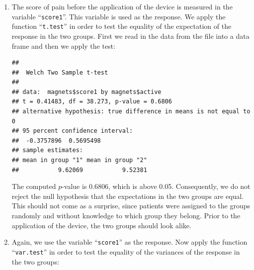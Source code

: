 \documentclass[
]{krantz}
\makeatletter
\newenvironment{Shaded}{\begin{snugshade}}{\end{snugshade}}
\newcommand{\KeywordTok}[1]{\textcolor[rgb]{0.13,0.29,0.53}{\textbf{#1}}}
\newcommand{\NormalTok}[1]{#1}
\newcommand{\OperatorTok}[1]{\textcolor[rgb]{0.81,0.36,0.00}{\textbf{#1}}}
\newcommand{\StringTok}[1]{\textcolor[rgb]{0.31,0.60,0.02}{#1}}
\newenvironment{kframe}{%
\medskip{}
\setlength{\fboxsep}{.8em}
 \def\at@end@of@kframe{}%
 \ifinner\ifhmode%
  \def\at@end@of@kframe{\end{minipage}}%
  \begin{minipage}{\columnwidth}%
 \fi\fi%
 \def\FrameCommand##1{\hskip\@totalleftmargin \hskip-\fboxsep
 \colorbox{shadecolor}{##1}\hskip-\fboxsep
     \hskip-\linewidth \hskip-\@totalleftmargin \hskip\columnwidth}%
 \MakeFramed {\advance\hsize-\width
   \@totalleftmargin\z@ \linewidth\hsize
   \@setminipage}}%
 {\par\unskip\endMakeFramed%
 \at@end@of@kframe}
\renewenvironment{Shaded}{\begin{kframe}}{\end{kframe}}
\theoremstyle{definition}
\theoremstyle{definition}
\theoremstyle{definition}
\theoremstyle{remark}
\makeatother
\begin{document}
\begin{enumerate}
\def\labelenumi{\arabic{enumi}.}
\item
  The score of pain before the
  application of the device is measured in the variable ``\texttt{score1}''. This
  variable is used as the response. We apply the function ``\texttt{t.test}'' in
  order to test the equality of the expectation of the response in the two
  groups. First we read in the data from the file into a data frame and
  then we apply the test:

\begin{Shaded}
\end{Shaded}

\begin{verbatim}
## 
##  Welch Two Sample t-test
## 
## data:  magnets$score1 by magnets$active
## t = 0.41483, df = 38.273, p-value = 0.6806
## alternative hypothesis: true difference in means is not equal to 0
## 95 percent confidence interval:
##  -0.3757896  0.5695498
## sample estimates:
## mean in group "1" mean in group "2" 
##           9.62069           9.52381
\end{verbatim}

  The computed \(p\)-value is 0.6806, which is above 0.05. Consequently, we
  do not reject the null hypothesis that the expectations in the two
  groups are equal. This should not come as a surprise, since patients
  were assigned to the groups randomly and without knowledge to which
  group they belong. Prior to the application of the device, the two
  groups should look alike.
\item
  Again, we use the variable ``\texttt{score1}''
  as the response. Now apply the function ``\texttt{var.test}'' in order to test
  the equality of the variances of the response in the two groups:

\begin{Shaded}
\end{Shaded}


\end{enumerate}
\end{document}
